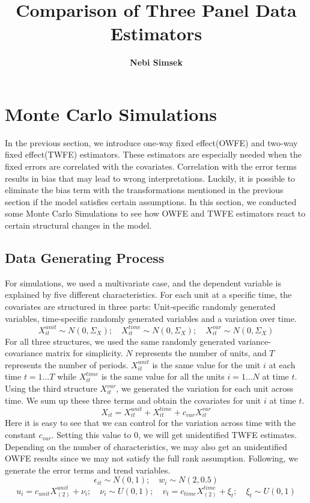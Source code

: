 \documentclass[12pt, a4paper]{article}
\begin{document}
\title{Comparison of Three Panel Data Estimators}
\author{\textbf{\LARGE{Nebi Simsek}}}
\date{}

\maketitle

\section{Monte Carlo Simulations}
In the previous section, we introduce one-way fixed effect(OWFE) and two-way fixed effect(TWFE) estimators.
These estimators are especially needed when the fixed errors are correlated with the covariates.
Correlation with the error terms results in bias that may lead to wrong interpretations.
Luckily, it is possible to eliminate the bias term with the transformations mentioned in the previous
section if the model satisfies certain assumptions. In this section, we conducted some
Monte Carlo Simulations to see how OWFE and TWFE estimators
react to certain structural changes in the model.

\subsection{Data Generating Process}
For simulations, we used a multivariate case, and the dependent variable is
explained by five different characteristics. For each unit at a specific time,
the covariates are structured in three parts: Unit-specific randomly
generated variables, time-specific randomly generated variables
and a variation over time.
$$X_{it}^{unit} \sim N(0, \Sigma_{X}); \quad
X_{it}^{time} \sim N(0, \Sigma_{X}); \quad
X_{it}^{var} \sim N(0, \Sigma_{X})
$$
For all three structures, we used the same randomly generated variance-covariance
matrix for simplicity. $N$ represents the number of units, and $T$ represents
the number of  periods. $X_{it}^{unit}$ is the same value for the unit $i$
at each time $t = 1 \ldots T$ while $X_{it}^{time}$ is the same value for
all the units $i = 1 \ldots N$ at time $t$. Using the third structure $X_{it}^{var}$,
we generated the variation for each unit across time. We sum up these three terms
and obtain the covariates for unit $i$ at time $t$.
$$X_{it} = X_{it}^{unit} + X_{it}^{time} + c_{var} X_{it}^{var}$$
Here it is easy to see that we can control for the variation across time with the constant $c_{var}$. Setting this value to $0$, we will get unidentified TWFE estimates.
Depending on the number of characteristics, we may also get an unidentified OWFE results since we may not satisfy the full rank assumption. Following, we generate the error terms and trend variables.
$$\epsilon_{it} \sim N(0, 1); \quad w_{i} \sim N(2, 0.5)$$
$$u_i = c_{unit}X_{(2)}^{unit} + \nu_{i}; \quad \nu_{i} \sim U(0,1);
\quad v_t = c_{time}X_{(2)}^{time}  + \xi_{t}; \quad \xi_{t} \sim U(0,1)$$
\end{document}
